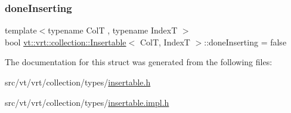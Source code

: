 \subsubsection{\texorpdfstring{done\+Inserting}{doneInserting}}
{\footnotesize\ttfamily template$<$typename ColT , typename IndexT $>$ \\
bool \hyperlink{structvt_1_1vrt_1_1collection_1_1_insertable}{vt\+::vrt\+::collection\+::\+Insertable}$<$ ColT, IndexT $>$\+::done\+Inserting = false\hspace{0.3cm}{\ttfamily [protected]}}



The documentation for this struct was generated from the following files\+:\begin{DoxyCompactItemize}
\item 
src/vt/vrt/collection/types/\hyperlink{types_2insertable_8h}{insertable.\+h}\item 
src/vt/vrt/collection/types/\hyperlink{types_2insertable_8impl_8h}{insertable.\+impl.\+h}\end{DoxyCompactItemize}
